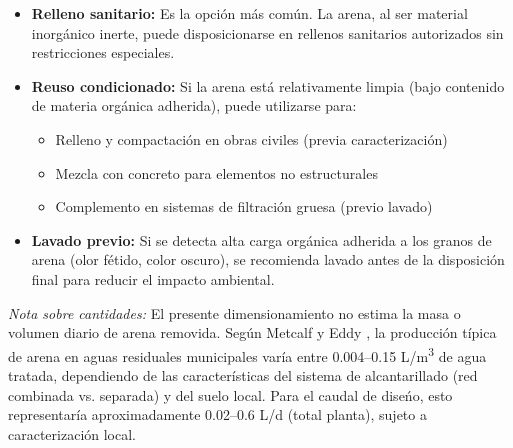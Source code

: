 \begin{itemize}[noitemsep,leftmargin=2em]
    \item \textbf{Relleno sanitario:} Es la opci\'on m\'as com\'un. La arena, al ser material inorg\'anico inerte, puede disposicionarse en rellenos sanitarios autorizados sin restricciones especiales.
    \item \textbf{Reuso condicionado:} Si la arena est\'a relativamente limpia (bajo contenido de materia org\'anica adherida), puede utilizarse para:
    \begin{itemize}[noitemsep,leftmargin=1.5em]
        \item Relleno y compactaci\'on en obras civiles (previa caracterizaci\'on)
        \item Mezcla con concreto para elementos no estructurales
        \item Complemento en sistemas de filtraci\'on gruesa (previo lavado)
    \end{itemize}
    \item \textbf{Lavado previo:} Si se detecta alta carga org\'anica adherida a los granos de arena (olor f\'etido, color oscuro), se recomienda lavado antes de la disposici\'on final para reducir el impacto ambiental.
\end{itemize}

\textit{Nota sobre cantidades:} El presente dimensionamiento no estima la masa o volumen diario de arena removida. Seg\'un Metcalf y Eddy \cite{metcalf2014}, la producci\'on t\'ipica de arena en aguas residuales municipales var\'ia entre 0.004--0.15 L/m\textsuperscript{3} de agua tratada, dependiendo de las caracter\'isticas del sistema de alcantarillado (red combinada vs. separada) y del suelo local. Para el caudal de dise\'no, esto representar\'ia aproximadamente 0.02--0.6 L/d (total planta), sujeto a caracterizaci\'on local.